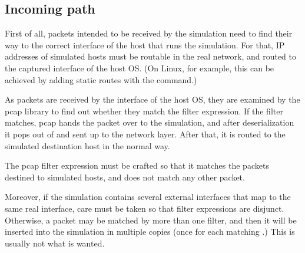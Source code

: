 \subsection*{Incoming path}

First of all, packets intended to be received by the simulation
need to find their way to the correct  interface of the host that
runs the simulation. For that, IP addresses of simulated hosts
must be routable in the real network, and routed to the captured
interface of the host OS. (On Linux, for example, this can be achieved
by adding static routes with the  command.)

As packets are received by the interface of the host OS, they
are examined by the pcap library to find out whether they match
the filter expression. If the filter matches, pcap hands the
packet over to the simulation, and after deserialization
it pops out of  and sent up to the network
layer. After that, it is routed to the simulated destination host
in the normal way.

The pcap filter expression must be crafted so that it matches
the packets destined to simulated hosts, and does not match
any other packet.

Moreover, if the simulation contains several external interfaces
that map to the same real interface, care must be taken so that
filter expressions are disjunct. Otherwise, a packet may be
matched by more than one filter, and then it will be inserted
into the simulation in multiple copies (once for each matching
.) This is usually not what is wanted.


